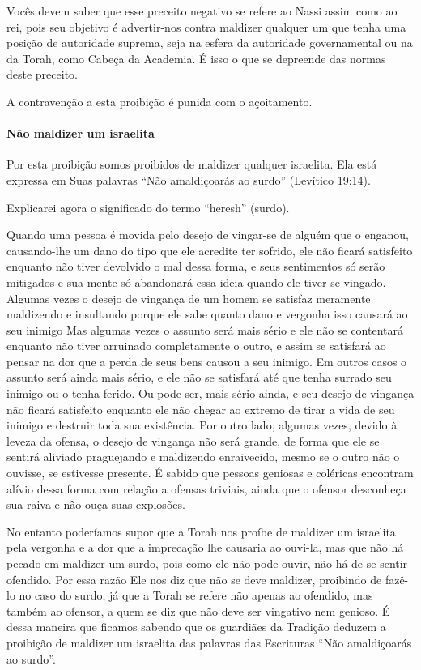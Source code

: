Vocês devem saber que esse preceito negativo se refere ao Nassi assim
como ao rei, pois seu objetivo é advertir-nos contra maldizer qualquer
um que tenha uma posição de autoridade suprema, seja na esfera da
autoridade governamental ou na da Torah, como Cabeça da Academia. É
isso o que se depreende das normas deste preceito.

A contravenção a esta proibição é punida com o açoitamento.

\paragraph{Não maldizer um israelita}

Por esta proibição somos proibidos de maldizer qualquer israelita. Ela
está expressa em Suas palavras ``Não amaldiçoarás ao surdo'' (Levítico
19:14).

Explicarei agora o significado do termo ``heresh'' (surdo).

Quando uma pessoa é movida pelo desejo de vingar-se de alguém que o
enganou, causando-lhe um dano do tipo que ele acredite ter sofrido, ele
não ficará satisfeito enquanto não tiver devolvido o mal dessa forma, e
seus sentimentos só serão mitigados e sua mente só abandonará essa ideia
quando ele tiver se vingado. Algumas vezes o desejo de vingança de um
homem se satisfaz meramente maldizendo e insultando porque ele sabe
quanto dano e vergonha isso causará ao seu inimigo Mas algumas vezes o assunto será mais
sério e ele não se contentará enquanto não tiver arruinado completamente
o outro, e assim se satisfará ao pensar na dor que a perda de seus bens
causou a seu inimigo. Em outros casos o assunto será ainda mais sério, e
ele não se satisfará até que tenha surrado seu inimigo ou o tenha
ferido. Ou pode ser, mais sério ainda, e seu desejo de
vingança não ficará satisfeito enquanto ele não chegar ao extremo de
tirar a vida de seu inimigo e destruir toda sua existência. Por outro
lado, algumas vezes, devido à leveza da ofensa, o desejo de vingança não
será grande, de forma que ele se sentirá aliviado praguejando e
maldizendo enraivecido, mesmo se o outro não o ouvisse, se estivesse
presente. É sabido que pessoas geniosas e coléricas encontram alívio
dessa forma com relação a ofensas triviais, ainda que o ofensor
desconheça sua raiva e não ouça suas explosões.

No entanto poderíamos supor que a Torah nos proíbe de maldizer um
israelita pela vergonha e a dor que a imprecação lhe causaria ao
ouvi-la, mas que não há pecado em maldizer um surdo, pois como ele não
pode ouvir, não há de se sentir ofendido. Por essa razão Ele nos diz que
não se deve maldizer, proibindo de fazê-lo no caso do surdo, já que a
Torah se refere não apenas ao ofendido, mas também ao ofensor, a quem se
diz que não deve ser vingativo nem genioso. É dessa maneira que ficamos
sabendo que os guardiães da Tradição deduzem a proibição de maldizer um
israelita das palavras das Escrituras ``Não amaldiçoarás ao surdo''.

